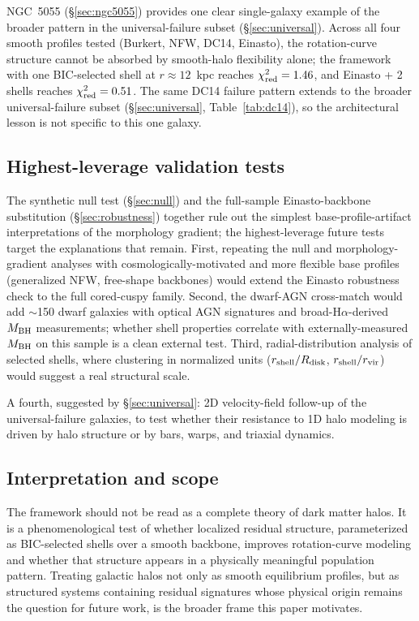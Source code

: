 NGC~5055 (\S\ref{sec:ngc5055}) provides one clear single-galaxy example of the broader pattern in the universal-failure subset (\S\ref{sec:universal}). Across all four smooth profiles tested (Burkert, NFW, DC14, Einasto), the rotation-curve structure cannot be absorbed by smooth-halo flexibility alone; the framework with one BIC-selected shell at $r \approx 12$~kpc reaches $\chi^2_{\rm red} = 1.46$, and Einasto + 2 shells reaches $\chi^2_{\rm red} = 0.51$. The same DC14 failure pattern extends to the broader universal-failure subset (\S\ref{sec:universal}, Table~\ref{tab:dc14}), so the architectural lesson is not specific to this one galaxy.

\subsection{Highest-leverage validation tests}
\label{sec:future}

The synthetic null test (\S\ref{sec:null}) and the full-sample Einasto-backbone substitution (\S\ref{sec:robustness}) together rule out the simplest base-profile-artifact interpretations of the morphology gradient; the highest-leverage future tests target the explanations that remain. First, repeating the null and morphology-gradient analyses with cosmologically-motivated and more flexible base profiles (generalized NFW, free-shape backbones) would extend the Einasto robustness check to the full cored-cuspy family. Second, the \citet{ReinesGreeneGeha2013} dwarf-AGN cross-match would add $\sim$150 dwarf galaxies with optical AGN signatures and broad-H$\alpha$-derived $M_{\rm BH}$ measurements; whether shell properties correlate with externally-measured $M_{\rm BH}$ on this sample is a clean external test. Third, radial-distribution analysis of selected shells, where clustering in normalized units ($r_{\rm shell}/R_{\rm disk}$, $r_{\rm shell}/r_{\rm vir}$) would suggest a real structural scale.

A fourth, suggested by \S\ref{sec:universal}: 2D velocity-field follow-up of the universal-failure galaxies, to test whether their resistance to 1D halo modeling is driven by halo structure or by bars, warps, and triaxial dynamics.

\subsection{Interpretation and scope}

The framework should not be read as a complete theory of dark matter halos. It is a phenomenological test of whether localized residual structure, parameterized as BIC-selected shells over a smooth backbone, improves rotation-curve modeling and whether that structure appears in a physically meaningful population pattern. Treating galactic halos not only as smooth equilibrium profiles, but as structured systems containing residual signatures whose physical origin remains the question for future work, is the broader frame this paper motivates.

